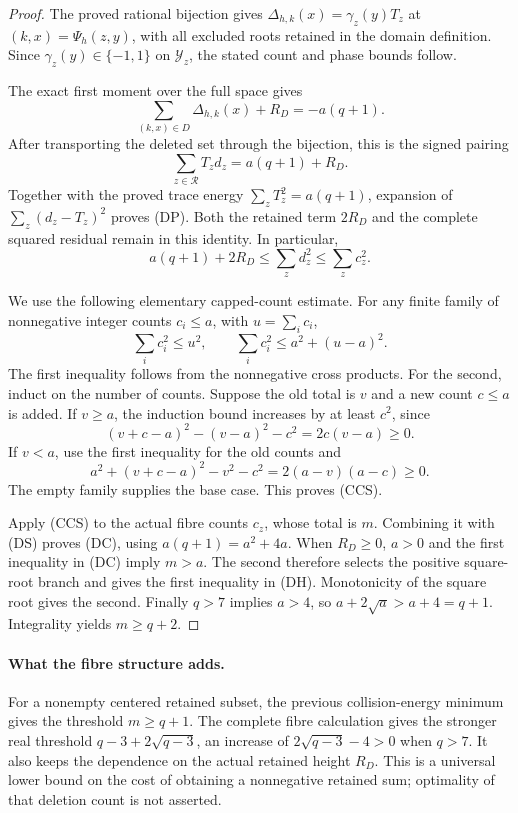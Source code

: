 \documentclass[11pt]{article}
\begin{document}
\begin{proof}
The proved rational bijection gives
\(\Delta_{h,k}(x)=\gamma_z(y)T_z\) at
\((k,x)=\Psi_h(z,y)\), with all excluded roots retained in the
domain definition. Since \(\gamma_z(y)\in\{-1,1\}\) on
\(\mathcal Y_z\), the stated count and phase bounds follow.

The exact first moment over the full space gives
\[
 \sum_{(k,x)\in D}\Delta_{h,k}(x)+R_D=-a(q+1).
\]
After transporting the deleted set through the bijection, this is
the signed pairing
\[
 \sum_{z\in\mathcal R}T_zd_z=a(q+1)+R_D.
\]
Together with the proved trace energy
\(\sum_zT_z^2=a(q+1)\), expansion of
\(\sum_z(d_z-T_z)^2\) proves (DP). Both the retained term \(2R_D\)
and the complete squared residual remain in this identity.
In particular,
\[
 a(q+1)+2R_D\le\sum_z d_z^2\le\sum_z c_z^2. \tag{DS}
\]

We use the following elementary capped-count estimate. For any
finite family of nonnegative integer counts \(c_i\le a\), with
\(u=\sum_i c_i\),
\[
 \sum_i c_i^2\le u^2,\qquad
 \sum_i c_i^2\le a^2+(u-a)^2. \tag{CCS}
\]
The first inequality follows from the nonnegative cross products.
For the second, induct on the number of counts. Suppose the old
total is \(v\) and a new count \(c\le a\) is added. If \(v\ge a\),
the induction bound increases by at least \(c^2\), since
\[
 (v+c-a)^2-(v-a)^2-c^2=2c(v-a)\ge0.
\]
If \(v<a\), use the first inequality for the old counts and
\[
 a^2+(v+c-a)^2-v^2-c^2=2(a-v)(a-c)\ge0.
\]
The empty family supplies the base case. This proves (CCS).

Apply (CCS) to the actual fibre counts \(c_z\), whose total is \(m\).
Combining it with (DS) proves (DC), using
\(a(q+1)=a^2+4a\).
When \(R_D\ge0\), \(a>0\) and the first inequality in (DC) imply
\(m>a\). The second therefore selects the positive square-root
branch and gives the first inequality in (DH). Monotonicity of
the square root gives the second. Finally \(q>7\) implies
\(a>4\), so \(a+2\sqrt a>a+4=q+1\). Integrality yields
\(m\ge q+2\).
\end{proof}

\paragraph{What the fibre structure adds.}
For a nonempty centered retained subset, the previous collision-energy
minimum gives the threshold \(m\ge q+1\).
The complete fibre calculation gives the stronger real threshold
\(q-3+2\sqrt{q-3}\), an increase of
\(2\sqrt{q-3}-4>0\) when \(q>7\).
It also keeps the dependence on the actual retained height \(R_D\).
This is a universal lower bound on the cost of obtaining a nonnegative
retained sum; optimality of that deletion count is not asserted.
\end{document}
